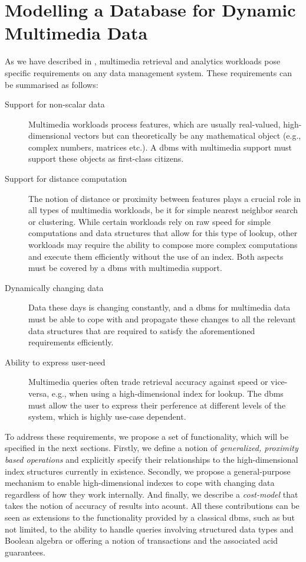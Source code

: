\chapter{Modelling a Database for Dynamic Multimedia Data}
\label{chapter:system_model}

As we have described in , multimedia retrieval and analytics workloads pose specific requirements on any data management system. These requirements can be summarised as follows:

\begin{description}
    \item[Support for non-scalar data] Multimedia workloads process features, which are usually real-valued, high-dimensional vectors but can theoretically be any mathematical object (e.g., complex numbers, matrices etc.). A \acrshort{dbms} with multimedia support must support these objects as first-class citizens.
    \item[Support for distance computation] The notion of distance or proximity between features plays a crucial role in all types of multimedia workloads, be it for simple nearest neighbor search or clustering. While certain workloads rely on raw speed for simple computations and data structures that allow for this type of lookup, other workloads may require the ability to compose more complex computations and execute them efficiently without the use of an index. Both aspects must be covered by a \acrshort{dbms} with multimedia support.
    \item[Dynamically changing data] Data these days is changing constantly, and a \acrshort{dbms} for multimedia data must be able to cope with and propagate these changes to all the relevant data structures that are required to satisfy the aforementioned requirements efficiently.
    \item[Ability to express user-need] Multimedia queries often trade retrieval accuracy against speed or vice-versa, e.g., when using a high-dimensional index for lookup. The \acrshort{dbms} must allow the user to express their perference at different levels of the system, which is highly use-case dependent.
\end{description}

To address these requirements, we propose a set of functionality, which will be specified in the next sections. Firstly, we define a notion of \emph{generalized, proximity based operations} and explicitly specify their relationships to the high-dimensional index structures currently in existence. Secondly, we propose a general-purpose mechanism to enable high-dimensional indexes to cope with changing data regardless of how they work internally. And finally, we describe a \emph{cost-model} that takes the notion of accuracy of results into acount. All these contributions can be seen as extensions to the functionality provided by a classical \acrshort{dbms}, such as but not limited, to the ability to handle queries involving structured data types and Boolean algebra or offering a notion of transactions and the associated \acrshort{acid} guarantees.

